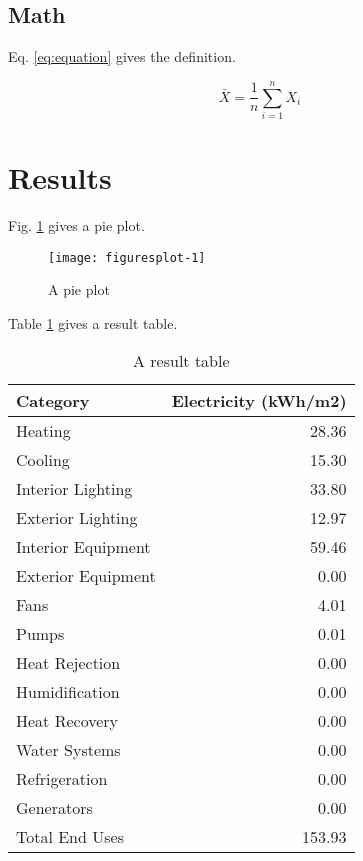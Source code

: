 \documentclass[]{elsarticle} %
\begin{document}
\hypertarget{math}{%
\subsection{Math}\label{math}}

Eq. \eqref{eq:equation} gives the definition.

\begin{equation}
  \bar{X}=\frac{1}{n}\sum_{i=1}^nX_i
  \label{eq:equation}
\end{equation}

\hypertarget{results}{%
\section{Results}\label{results}}

Fig. \ref{fig:plot} gives a pie plot.

\begin{figure}[!htb]

{\centering \texttt{[image: figuresplot-1]} 

}

\caption{A pie plot}\label{fig:plot}
\end{figure}

Table \ref{tab:table} gives a result table.

\begin{table}[htbp]

\caption{\label{tab:table}A result table}
\centering
\begin{tabular}[t]{lr}
\toprule
Category & Electricity (kWh/m2)\\
\midrule
Heating & 28.36\\
Cooling & 15.30\\
Interior Lighting & 33.80\\
Exterior Lighting & 12.97\\
Interior Equipment & 59.46\\
Exterior Equipment & 0.00\\
Fans & 4.01\\
Pumps & 0.01\\
Heat Rejection & 0.00\\
Humidification & 0.00\\
Heat Recovery & 0.00\\
Water Systems & 0.00\\
Refrigeration & 0.00\\
Generators & 0.00\\
Total End Uses & 153.93\\
\bottomrule
\end{tabular}
\end{table}
\end{document}
